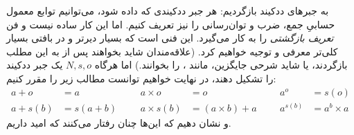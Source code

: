 \documentclass[../../../include/open-logic-section]{subfiles}
\begin{document}
به جبرهای ددکیند بازگردیم: هر جبر ددکیندی که داده شود، می‌توانیم توابع
معمول حسابیِ جمع، ضرب و توان‌رسانی را نیز تعریف کنیم. اما این کار
ساده نیست و فن \emph{تعریف بازگشتی} را به کار می‌گیرد. این فنی است که
بسیار دیرتر و در بافتی بسیار کلی‌تر معرفی و توجیه خواهیم کرد. (علاقه‌مندان
شاید بخواهند پس از  به این مطلب
بازگردند، یا شاید شرحی جایگزین، مانند \citealt[صص.~95--8]{Potter2004}، را
بخوانند.) اما هرگاه $N, s, o$ یک جبر ددکیند را تشکیل دهند، در نهایت
خواهیم توانست مطالب زیر را مقرر کنیم:
\begin{align*}
	{a} + {o} &= {a} & & & {a} \times {o} &= {o} & & & {a}^{o} &= s(o)\\
{a} + {s}({b}) &= {s}({a}+{b}) &&& {a} \times {s}({b}) &= ({a}\times {b}) + {a}  & & & {a}^{{s}({b})} &= {a}^{b} \times {a}
\end{align*}
و نشان دهیم که این‌ها چنان رفتار می‌کنند که امید داریم.
\end{document}

